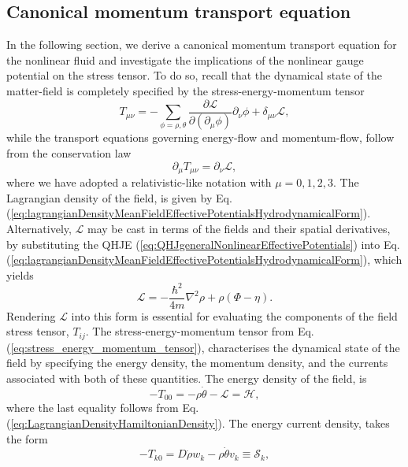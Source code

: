 \documentclass[twocolumn, nofootinbib, nobibnotes, amsmath,amssymb,aps, pra, floatfix]{revtex4-1}
\newcommand{\pd}[2]{\frac{\partial #1}{\partial #2}} %
\begin{document}
\subsection{Canonical momentum transport equation}
In the following section, we derive a canonical momentum transport equation for the nonlinear fluid and investigate the implications of the nonlinear gauge potential on the stress tensor.
To do so, recall that the dynamical state of the matter-field is completely specified by the stress-energy-momentum tensor
\begin{equation}
T_{\mu\nu}=-\sum_{\phi=\rho,\theta}\pd{\mathcal{L}}{(\partial_{\mu}\phi)}\partial_{\nu}\phi +\delta_{\mu\nu}\mathcal{L},
  \label{eq:stress_energy_momentum_tensor}
\end{equation}
while the transport equations governing energy-flow and momentum-flow, follow from the conservation law
\begin{equation}
  \partial_{\mu}T_{\mu\nu}=\partial_{\nu}\mathcal{L},
  \label{eq:conservation_energy_momentum}
\end{equation}
where we have adopted a relativistic-like notation with $\mu=0,1,2,3$. 
The Lagrangian density of the field, is given by Eq. (\ref{eq:lagrangianDensityMeanFieldEffectivePotentialsHydrodynamicalForm}). 
Alternatively, $\mathcal{L}$ may be cast in terms of the fields and their spatial derivatives, by substituting the QHJE (\ref{eq:QHJgeneralNonlinearEffectivePotentials}) into Eq. (\ref{eq:lagrangianDensityMeanFieldEffectivePotentialsHydrodynamicalForm}), which yields 
\begin{equation}
  \mathcal{L}=-\frac{\hbar^2}{4m}\nabla^2\rho+\rho\left( \Phi-\eta \right).
  \label{eq:Lagrangian_multi_component_nonlinear_gauge_potential_polar_form_simplified}
\end{equation}
Rendering $\mathcal{L}$ into this form is essential for evaluating the components of the field stress tensor, $T_{ij}$.
The stress-energy-momentum tensor from Eq. (\ref{eq:stress_energy_momentum_tensor}), characterises the dynamical state of the field by specifying the energy density, the momentum density, and the currents associated with both of these quantities.
The energy density of the field, is
\begin{equation}
  -T_{00}=-\rho\dot{\theta}-\mathcal{L}=\mathcal{H},
  \label{eq:energy_density}
\end{equation}
where the last equality follows from Eq. (\ref{eq:LagrangianDensityHamiltonianDensity}).
The energy current density, takes the form
\begin{equation}
  -T_{k0}=D\dot{\rho}w_k-\rho \dot{\theta}v_k\equiv\mathcal{S}_k, 
  \label{eq:energy_current_density}
\end{equation}
\end{document}
